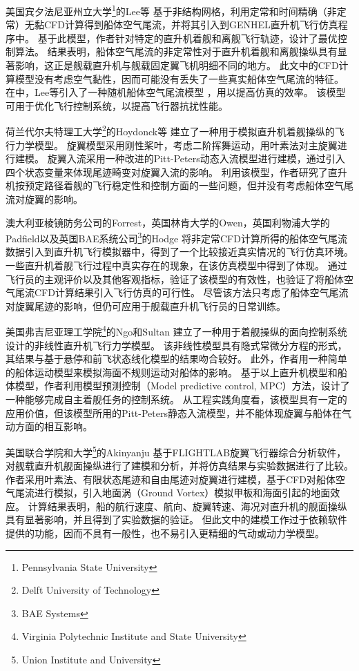 \documentclass[doctor,openright,twoside,color]{buaathesis}
\begin{document}
美国宾夕法尼亚州立大学\footnote{Pennsylvania State University}的Lee等
基于非结构网格，利用定常和时间精确（非定常）无黏CFD计算得到船体空气尾流，并将其引入到GENHEL直升机飞行仿真程序中。
基于此模型，作者针对特定的直升机着舰和离舰飞行轨迹，设计了最优控制算法。
结果表明，船体空气尾流的非定常性对于直升机着舰和离舰操纵具有显著影响，这正是舰载直升机与舰载固定翼飞机明细不同的地方。
此文中的CFD计算模型没有考虑空气黏性，因而可能没有丢失了一些真实船体空气尾流的特征。
在\cite{Lee2004}中，Lee等引入了一种随机船体空气尾流模型 ，用以提高仿真的效率。
该模型可用于优化飞行控制系统，以提高飞行器抗扰性能。

荷兰代尔夫特理工大学\footnote{Delft University of Technology}的Hoydonck等
建立了一种用于模拟直升机着舰操纵的飞行力学模型。
旋翼模型采用刚性桨叶，考虑二阶挥舞运动，用叶素法对主旋翼进行建模。
旋翼入流采用一种改进的Pitt-Peters动态入流模型进行建模，通过引入四个状态变量来体现尾迹畸变对旋翼入流的影响。
利用该模型，作者研究了直升机按预定路径着舰的飞行稳定性和控制方面的一些问题，但并没有考虑船体空气尾流对旋翼的影响。

澳大利亚棱镜防务公司的Forrest，英国林肯大学的Owen，英国利物浦大学的Padfield以及英国BAE系统公司\footnote{BAE Systems}的Hodge
将非定常CFD计算所得的船体空气尾流数据引入到直升机飞行模拟器中，得到了一个比较接近真实情况的飞行仿真环境。
一些直升机着舰飞行过程中真实存在的现象，在该仿真模型中得到了体现。
通过飞行员的主观评价以及其他客观指标，验证了该模型的有效性，也验证了将船体空气尾流CFD计算结果引入飞行仿真的可行性。
尽管该方法只考虑了船体空气尾流对旋翼尾迹的影响，但仍可应用于舰载直升机飞行员的日常训练。

美国弗吉尼亚理工学院\footnote{Virginia Polytechnic Institute and State University}的Ngo和Sultan
建立了一种用于着舰操纵的面向控制系统设计的非线性直升机飞行力学模型。
该非线性模型具有隐式常微分方程的形式，其结果与基于悬停和前飞状态线化模型的结果吻合较好。
此外，作者用一种简单的船体运动模型来模拟海面不规则运动对船体的影响。
基于以上直升机模型和船体模型，作者利用模型预测控制（Model predictive control, MPC）方法，设计了一种能够完成自主着舰任务的控制系统。
从工程实践角度看，该模型具有一定的应用价值，但该模型所用的Pitt-Peters静态入流模型，并不能体现旋翼与船体在气动方面的相互影响。

美国联合学院和大学\footnote{Union Institute and University}的Akinyanju
基于FLIGHTLAB旋翼飞行器综合分析软件，对舰载直升机舰面操纵进行了建模和分析，并将仿真结果与实验数据进行了比较。
作者采用叶素法、有限状态尾迹和自由尾迹对旋翼进行建模，基于CFD对船体空气尾流进行模拟，引入地面涡（Ground Vortex）模拟甲板和海面引起的地面效应。
计算结果表明，船的航行速度、航向、旋翼转速、海况对直升机的舰面操纵具有显著影响，并且得到了实验数据的验证。
但此文中的建模工作过于依赖软件提供的功能，因而不具有一般性，也不易引入更精细的气动或动力学模型。
\end{document}
